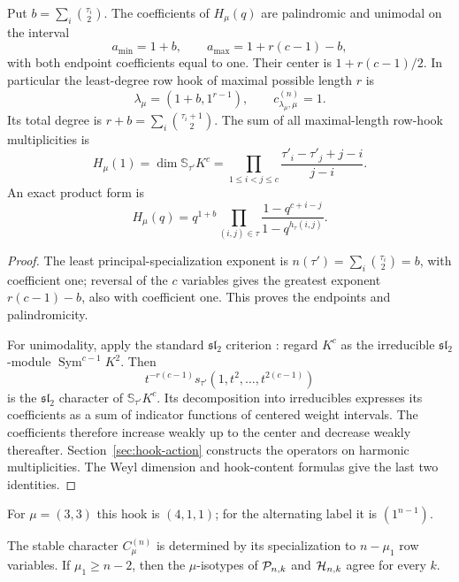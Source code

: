 \begin{corollary}
\label{cor:maximal-hook-coefficients}
Put $b=\sum_i\binom{\tau_i}{2}$. The coefficients of $H_\mu(q)$
are palindromic and unimodal on the interval
\[
             a_{\min}=1+b,\qquad a_{\max}=1+r(c-1)-b,
\]
with both endpoint coefficients equal to one. Their center is
$1+r(c-1)/2$. In particular the least-degree row hook of maximal
possible length $r$ is
\begin{equation}\label{eq:explicit-length-witness}
 \lambda_\mu=(1+b,1^{r-1}),\qquad c_{\lambda_\mu,\mu}^{(n)}=1.
\end{equation}
Its total degree is
$r+b=\sum_i\binom{\tau_i+1}{2}$. The sum of all maximal-length
row-hook multiplicities is
\[
 H_\mu(1)=\dim\mathbb S_{\tau'}K^c
 =\prod_{1\le i<j\le c}
                 \frac{\tau'_i-\tau'_j+j-i}{j-i}.
\]
An exact product form is
\[
 H_\mu(q)=q^{1+b}
   \prod_{(i,j)\in\tau}\frac{1-q^{c+i-j}}{1-q^{h_\tau(i,j)}}.
\]
\end{corollary}
\begin{proof}
The least principal-specialization exponent is
$n(\tau')=\sum_i\binom{\tau_i}{2}=b$, with coefficient one;
reversal of the $c$ variables gives the greatest exponent
$r(c-1)-b$, also with coefficient one. This proves the endpoints
and palindromicity.

For unimodality, apply the standard $\mathfrak{sl}_2$ criterion
\cite{Proctor1982,Stanley1989}: regard $K^c$ as the irreducible
$\mathfrak{sl}_2$-module $\operatorname{Sym}^{c-1}K^2$. Then
\[
 t^{-r(c-1)}s_{\tau'}(1,t^2,\ldots,t^{2(c-1)})
\]
is the $\mathfrak{sl}_2$ character of $\mathbb S_{\tau'}K^c$.
Its decomposition into irreducibles expresses its coefficients as
a sum of indicator functions of centered weight intervals. The
coefficients therefore increase weakly up to the center and decrease
weakly thereafter. Section~\ref{sec:hook-action} constructs the
operators on harmonic multiplicities. The Weyl dimension and hook-content
formulas give the last two identities.
\end{proof}

For $\mu=(3,3)$ this hook is $(4,1,1)$; for the alternating label
it is $(1^{n-1})$.

\begin{corollary}
\label{cor:near-row}
The stable character $C_\mu^{(n)}$ is determined by its
specialization to $n-\mu_1$ row variables.
If $\mu_1\geq n-2$, then the $\mu$-isotypes of
$\mathcal P_{n,k}$ and $\mathcal H_{n,k}$ agree for every $k$.
\end{corollary}

